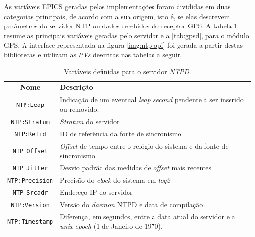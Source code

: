 \vspace{12pt}

As variáveis EPICS geradas pelas implementações foram divididas em duas
categorias principais, de acordo com a sua origem, isto é, se elas
descrevem parâmetros do servidor NTP ou dados recebidos do receptor GPS. A
tabela \ref{tab:ntpd} resume as principais variáveis geradas pelo servidor e a
\ref{tab:gpsd}, para o módulo GPS. A interface representada na figura
\ref{img:ntp-opi} foi gerada a partir destas bibliotecas e utilizam as
\textit{PVs} descritas nas tabelas a seguir.

\begin{table}[h]

	\centering
	\caption{\label{tab:ntpd} Variáveis definidas para o servidor
	\textit{NTPD}.}
	\begin{tabular}{| c | p{} |}
		\hline
		\textbf{Nome} & \textbf{Descrição} \\	\hhline{|=|=|}
		\texttt{NTP:Leap} & Indicação de um eventual \textit{leap second} pendente a
		ser inserido ou removido. \\
		\hline \texttt{NTP:Stratum} & \textit{Stratum} do servidor \\ \hline
		\texttt{NTP:Refid} & ID de referência da fonte de sincronismo \\ \hline
		\texttt{NTP:Offset} & \textit{Offset} de tempo entre o relógio do sistema e da
		fonte de sincronismo \\
		\hline \texttt{NTP:Jitter} & Desvio padrão das medidas de \textit{offset} mais
		recentes \\ \hline 
		\texttt{NTP:Precision} & Precisão do \textit{clock} do sistema em
		\textit{log2} \\
		\hline \texttt{NTP:Srcadr} & Endereço IP do servidor \\ \hline 			
		\texttt{NTP:Version} & Versão do \textit{daemon} NTPD e data de compilação \\
		\hline \texttt{NTP:Timestamp} & Diferença, em segundos, entre a data atual do
		servidor e a \textit{unix epoch} (1 de Janeiro de 1970). \\ \hline
	\end{tabular}	    
\end{table}


